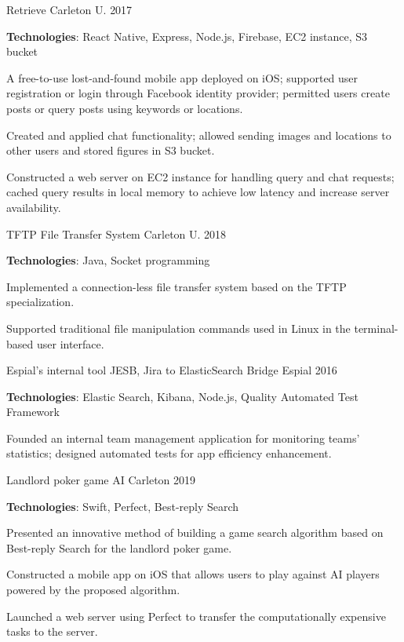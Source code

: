 \begin{cventries}

\cventry
{\textnormal{}}
{Retrieve}
{Carleton U.}
{2017}
{\begin{cvitems}
    \item {\textbf{Technologies}: React Native, Express, Node.js, Firebase, EC2 instance, S3 bucket}
    \item {A free-to-use lost-and-found mobile app deployed on iOS; supported user registration or login through Facebook identity provider; permitted users create posts or query posts using keywords or locations.}
    \item {Created and applied chat functionality; allowed sending images and locations to other users and stored figures in S3 bucket.}
    \item {Constructed a web server on EC2 instance for handling query and chat requests; cached query results in local memory to achieve low latency and increase server availability.}
\end{cvitems}}

\cventry
{\textnormal{}}
{TFTP File Transfer System}
{Carleton U.}
{2018}
{\begin{cvitems}
    \item {\textbf{Technologies}: Java, Socket programming}
    \item {Implemented a connection-less file transfer system based on the TFTP specialization.}
    \item {Supported traditional file manipulation commands used in Linux in the terminal-based user interface.}
\end{cvitems}}

\cventry
{\textnormal{Espial's internal tool}}
{JESB, Jira to ElasticSearch Bridge}
{Espial}
{2016}
{\begin{cvitems}
    \item {\textbf{Technologies}: Elastic Search, Kibana, Node.js, Quality Automated Test Framework}
    \item {Founded an internal team management application for monitoring teams' statistics; designed automated tests for app efficiency enhancement.}
\end{cvitems}}

\cventry
{\textnormal{}}
{Landlord poker game AI}
{Carleton}
{2019}
{\begin{cvitems}
    \item {\textbf{Technologies}: Swift, Perfect, Best-reply Search}
    \item {Presented an innovative method of building a game search algorithm based on Best-reply Search for the landlord poker game.}
    \item {Constructed a mobile app on iOS that allows users to play against AI players powered by the proposed algorithm.}
    \item {Launched a web server using Perfect to transfer the computationally expensive tasks to the server.}
\end{cvitems}}


\end{cventries}
